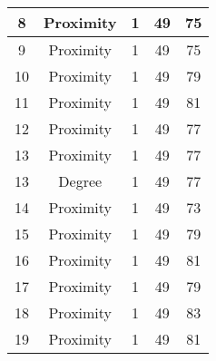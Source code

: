 \documentclass[results.tex]{subfiles}
\begin{document}
\begin{center}
\begin{tabular}{| c || c | c | c | c |}
            \hline
            8                       & Proximity                    & 1                      & 49                      & 75                   \\
            \hline
            9                       & Proximity                    & 1                      & 49                      & 75                   \\
            \hline
            10                      & Proximity                    & 1                      & 49                      & 79                   \\
            \hline
            11                      & Proximity                    & 1                      & 49                      & 81                   \\
            \hline
            12                      & Proximity                    & 1                      & 49                      & 77                   \\
            \hline
            13                      & Proximity                    & 1                      & 49                      & 77                   \\
            \hline
            13                      & Degree                       & 1                      & 49                      & 77                   \\
            \hline
            14                      & Proximity                    & 1                      & 49                      & 73                   \\
            \hline
            15                      & Proximity                    & 1                      & 49                      & 79                   \\
            \hline
            16                      & Proximity                    & 1                      & 49                      & 81                   \\
            \hline
            17                      & Proximity                    & 1                      & 49                      & 79                   \\
            \hline
            18                      & Proximity                    & 1                      & 49                      & 83                   \\
            \hline
            19                      & Proximity                    & 1                      & 49                      & 81                   \\

\end{tabular}
\end{center}
\end{document}
